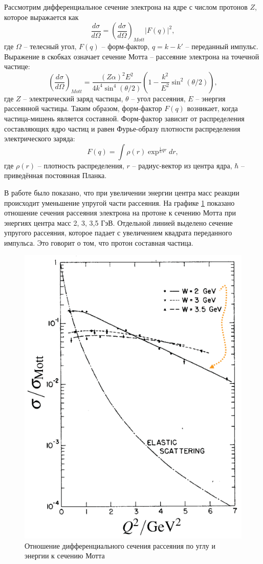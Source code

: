 \documentclass{extarticle}
\begin{document}
Рассмотрим дифференциальное сечение электрона на ядре с числом протонов $Z$, которое выражается как 
\begin{equation}
    \frac{d\sigma}{d\Omega} = ( \frac{d\sigma}{d\Omega})_{Mott} |F(q)|^2 ,
\end{equation}
где $\Omega$ -- телесный угол, $F(q)$ -- форм-фактор, $q = k-k'$ -- переданный импульс. Выражение в скобках означает сечение Мотта -- рассеяние электрона на точечной частице:
\begin{equation}
    (\frac{d\sigma}{d\Omega})_{Mott} = \frac{(Z\alpha)^2 E^2}{4k^4 \sin^4 (\theta/2)} (1- \frac{k^2}{E^2} \sin^2(\theta/2)),
\end{equation}
где $Z$ -- электрический заряд частицы, $\theta$ -- угол рассеяния, $E$ -- энергия рассеянной частицы. Таким образом, форм-фактор $F(q)$ возникает, когда частица-мишень является составной. Форм-фактор зависит от распределения составляющих ядро частиц и равен Фурье-образу плотности распределения электрического заряда:
\begin{equation}
    F(q) = \int \rho(r) \exp^{\frac{i}{\hbar}qr}dr,
\end{equation}
где $\rho(r)$ -- плотность распределения, $r$ -- радиус-вектор из центра ядра, $\hbar$ -- приведённая постоянная Планка.

В работе \cite{Breidenbach} было показано, что при увеличении энергии центра масс реакции происходит уменьшение упругой части рассеяния. На графике \ref{fig:Mott} показано отношение сечения рассеяния электрона на протоне к сечению Мотта при энергиях центра масс 2, 3, 3,5 ГэВ. Отдельной линией выделено сечение упругого рассеяния, которое падает с увеличением квадрата переданного импульса. Это говорит о том, что протон составная частица. 
\begin{figure}[h]
    \centering
    \includegraphics[width = 0.6\linewidth]{Mott.png}
    \caption{Отношение дифференциального сечения рассеяния по углу и энергии к сечению Мотта \cite{Breidenbach}}
    \label{fig:Mott}
\end{figure}
\end{document}
